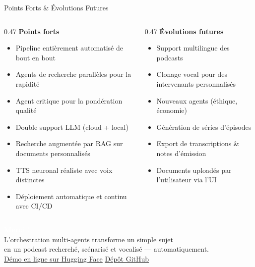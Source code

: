 \documentclass[aspectratio=169, 11pt]{beamer}
\begin{document}
\begin{frame}{Points Forts \& Évolutions Futures}
\vspace{0.1cm}
\small
\begin{columns}[T]
  \begin{column}{0.47\textwidth}
    \textbf{Points forts}
    \begin{itemize}\setlength{\itemsep}{2pt}
      \item Pipeline entièrement automatisé de bout en bout
      \item Agents de recherche parallèles pour la rapidité
      \item Agent critique pour la pondération qualité
      \item Double support LLM (cloud + local)
      \item Recherche augmentée par RAG sur documents personnalisés
      \item TTS neuronal réaliste avec voix distinctes
      \item Déploiement automatique et continu avec CI/CD
    \end{itemize}
  \end{column}
  \begin{column}{0.47\textwidth}
    \textbf{Évolutions futures}
    \begin{itemize}\setlength{\itemsep}{2pt}
      \item Support multilingue des podcasts
      \item Clonage vocal pour des intervenants personnalisés
      \item Nouveaux agents (éthique, économie)
      \item Génération de séries d'épisodes
      \item Export de transcriptions \& notes d'émission
      \item Documents uploadés par l'utilisateur via l'UI
    \end{itemize}
  \end{column}
\end{columns}
\end{frame}

{
\begin{frame}[plain]
\vfill
\begin{center}
  {\Huge\bfseries\textcolor{white}{Merci !}}\\[0.8cm]
  {\large\textcolor{white!90!accent}{L'orchestration multi-agents transforme un simple sujet\\en un podcast recherché, scénarisé et vocalisé — automatiquement.}}\\[1cm]
  {\small\textcolor{white!80!accent}{%
    \href{https://huggingface.co/spaces/regkhalil/multi-agent-podcast-generator}{Démo en ligne sur Hugging Face}%
    \qquad\qquad%
    \href{https://github.com/regkhalil/Multi-Agent-Podcast-Generator}{Dépôt GitHub}%
  }}
\end{center}
\vfill
\end{frame}
}
\end{document}

